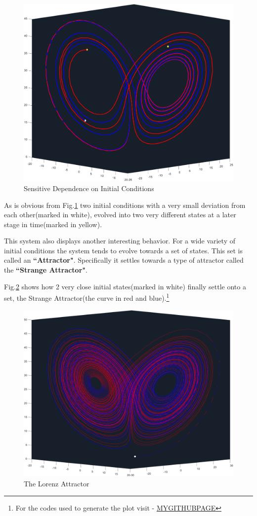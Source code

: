 \documentclass[14pts]{article}
\begin{document}
    \begin{figure}[h]
        \centering
        \includegraphics[width = \textwidth]{Images/Lorenz_Divergence.png}
        \caption{Sensitive Dependence on Initial Conditions}
        \label{fig:LorenzDiverge}
    \end{figure}

	As is obvious from Fig.\ref{fig:LorenzDiverge} two initial conditions with a very small deviation from each other(marked in white), evolved into two very different states at a later stage in time(marked in yellow).

    This system also displays another interesting behavior. For a wide variety of initial conditions the system tends to evolve towards a set of states. This set is called an \textbf{``Attractor"}.
    Specifically it settles towards a type of attractor called the \textbf{``Strange Attractor"}.

    Fig.\ref{fig:LorenzAttractor} shows how 2 very close initial states(marked in white) finally settle onto a set, the Strange Attractor(the curve in red and blue).\footnote[2]{For the codes used to generate the plot visit - \url{MYGITHUBPAGE}}

    \begin{figure}[h]
        \centering
        \includegraphics[width = \textwidth]{Images/Lorenz_Attractor.png}
        \caption{The Lorenz Attractor}
        \label{fig:LorenzAttractor}
    \end{figure}

	
\end{document}
